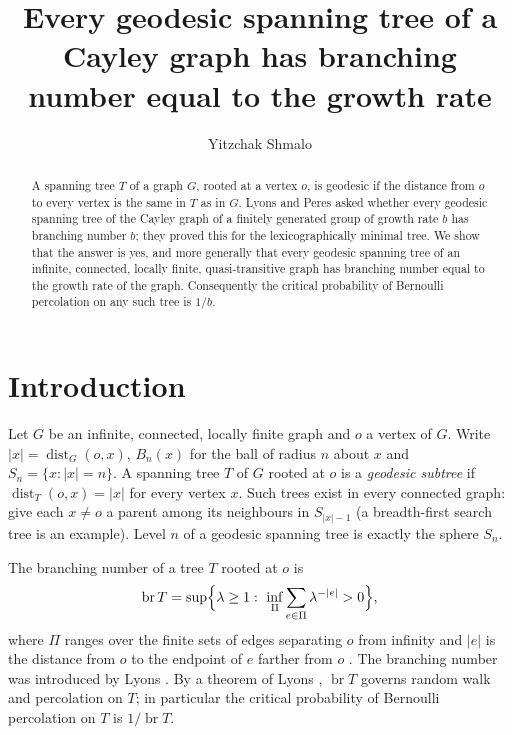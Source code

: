 \documentclass[11pt]{amsart}
\newcommand{\AUTHORNAME}{Yitzchak Shmalo}
\newcommand{\AFFILIATION}{Einstein Institute of Mathematics, The Hebrew University of Jerusalem, Jerusalem, Israel}
\newcommand{\AUTHOREMAIL}{}
\theoremstyle{remark}
\DeclareMathOperator{\br}{br}
\DeclareMathOperator{\dist}{dist}
\begin{document}
\title[Branching number of geodesic spanning trees]{Every geodesic spanning tree of a Cayley graph has branching number equal to the growth rate}

\author{\AUTHORNAME}
\address{\AFFILIATION}
\email{\AUTHOREMAIL}


\begin{abstract}
A spanning tree $T$ of a graph $G$, rooted at a vertex $o$, is geodesic if the distance from $o$ to every vertex is the same in $T$ as in $G$. Lyons and Peres asked whether every geodesic spanning tree of the Cayley graph of a finitely generated group of growth rate $b$ has branching number $b$; they proved this for the lexicographically minimal tree. We show that the answer is yes, and more generally that every geodesic spanning tree of an infinite, connected, locally finite, quasi-transitive graph has branching number equal to the growth rate of the graph. Consequently the critical probability of Bernoulli percolation on any such tree is $1/b$.
\end{abstract}

\maketitle

\section{Introduction}

Let $G$ be an infinite, connected, locally finite graph and $o$ a vertex of $G$. Write $|x|=\dist_G(o,x)$, $B_n(x)$ for the ball of radius $n$ about $x$ and $S_n=\{x:|x|=n\}$. A spanning tree $T$ of $G$ rooted at $o$ is a \emph{geodesic subtree} if $\dist_T(o,x)=|x|$ for every vertex $x$. Such trees exist in every connected graph: give each $x\ne o$ a parent among its neighbours in $S_{|x|-1}$ (a breadth-first search tree is an example). Level $n$ of a geodesic spanning tree is exactly the sphere $S_n$.

The branching number of a tree $T$ rooted at $o$ is
\[
\br T=\sup\Bigl\{\lambda\ge1:\ \inf_{\Pi}\sum_{e\in\Pi}\lambda^{-|e|}>0\Bigr\},
\]
where $\Pi$ ranges over the finite sets of edges separating $o$ from infinity and $|e|$ is the distance from $o$ to the endpoint of $e$ farther from $o$ \cite[Section~1.2]{LP}. The branching number was introduced by Lyons \cite{Lyons1990}. By a theorem of Lyons \cite{Lyons1990}, $\br T$ governs random walk and percolation on $T$; in particular the critical probability of Bernoulli percolation on $T$ is $1/\br T$.
\end{document}
